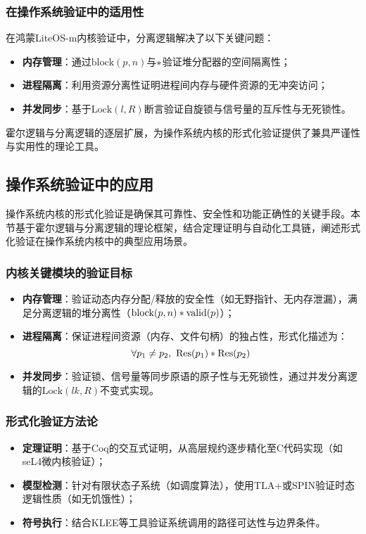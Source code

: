 \subsubsection{在操作系统验证中的适用性}
在鸿蒙LiteOS-m内核验证中，分离逻辑解决了以下关键问题：
\begin{itemize}
    \item \textbf{内存管理}：通过$\mathrm{block}(p, n)$与$\ast$验证堆分配器的空间隔离性；
    \item \textbf{进程隔离}：利用资源分离性证明进程间内存与硬件资源的无冲突访问；
    \item \textbf{并发同步}：基于$\mathrm{Lock}(l, R)$断言验证自旋锁与信号量的互斥性与无死锁性。
\end{itemize}

霍尔逻辑与分离逻辑的逐层扩展，为操作系统内核的形式化验证提供了兼具严谨性与实用性的理论工具。
\subsection{操作系统验证中的应用}
\label{subsec:os-verification}

操作系统内核的形式化验证是确保其可靠性、安全性和功能正确性的关键手段。本节基于霍尔逻辑与分离逻辑的理论框架，结合定理证明与自动化工具链，阐述形式化验证在操作系统内核中的典型应用场景。

\subsubsection{内核关键模块的验证目标}
\begin{itemize}
    \item \textbf{内存管理}：验证动态内存分配/释放的安全性（如无野指针、无内存泄漏），满足分离逻辑的堆分离性（$\mathrm{block}(p, n) \ast \mathrm{valid}(p)$）；
    \item \textbf{进程隔离}：保证进程间资源（内存、文件句柄）的独占性，形式化描述为：
        \begin{equation}
            \forall p_1 \neq p_2,\ \mathrm{Res}(p_1) \ast \mathrm{Res}(p_2)
        \end{equation}
    \item \textbf{并发同步}：验证锁、信号量等同步原语的原子性与无死锁性，通过并发分离逻辑的$\mathrm{Lock}(lk, R)$不变式实现。
\end{itemize}

\subsubsection{形式化验证方法论}
\begin{itemize}
    \item \textbf{定理证明}：基于Coq的交互式证明，从高层规约逐步精化至C代码实现（如seL4微内核验证）；
    \item \textbf{模型检测}：针对有限状态子系统（如调度算法），使用TLA+或SPIN验证时态逻辑性质（如无饥饿性）；
    \item \textbf{符号执行}：结合KLEE等工具验证系统调用的路径可达性与边界条件。
\end{itemize}

